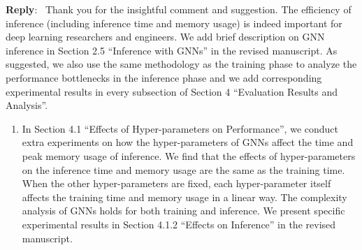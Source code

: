\documentclass[12pt]{article}
\newenvironment{reply}
   {\medskip \noindent \textbf{Reply}:\  }
   {\medskip}
\begin{document}
\begin{reply}
    Thank you for the insightful comment and suggestion.
    The efficiency of inference (including inference time and memory usage) is indeed important for deep learning researchers and engineers.
    We add brief description on GNN inference in Section 2.5 ``Inference with GNNs'' in the revised manuscript.
    As suggested, we also use the same methodology as the training phase to analyze the performance bottlenecks in the inference phase and we add corresponding experimental results in every subsection of Section 4 ``Evaluation Results and Analysis''.
    \begin{enumerate}
    
    \item In Section 4.1 ``Effects of Hyper-parameters on Performance'', we conduct extra experiments on how the hyper-parameters of GNNs affect the time and peak memory usage of inference.
    We find that the effects of hyper-parameters on the inference time and memory usage are the same as the training time.
    When the other hyper-parameters are fixed, each hyper-parameter itself affects the training time and memory usage in a linear way.
    The complexity analysis of GNNs holds for both training and inference.
    We present specific experimental results in Section 4.1.2 ``Effects on Inference'' in the revised manuscript.
    

\end{enumerate}
\end{reply}
\end{document}
